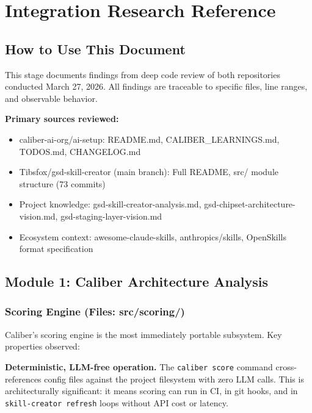 \documentclass[11pt,letterpaper]{article}
\newcommand{\stageheader}[2]{%
  \noindent\colorbox{#2}{\makebox[\textwidth][l]{%
    \textcolor{white}{\bfseries\sffamily\hspace{6pt}#1\hspace{6pt}}}}%
  \vspace{0.5em}\par%
}
\begin{document}
\newpage

\stageheader{STAGE 2 --- RESEARCH REFERENCE}{secondary}

\section{Integration Research Reference}

\subsection{How to Use This Document}

This stage documents findings from deep code review of both repositories conducted March 27, 2026. All findings are traceable to specific files, line ranges, and observable behavior.

\textbf{Primary sources reviewed:}
\begin{itemize}[leftmargin=1.5em]
  \item caliber-ai-org/ai-setup: README.md, CALIBER\_LEARNINGS.md, TODOS.md, CHANGELOG.md
  \item Tibsfox/gsd-skill-creator (main branch): Full README, src/ module structure (73 commits)
  \item Project knowledge: gsd-skill-creator-analysis.md, gsd-chipset-architecture-vision.md, gsd-staging-layer-vision.md
  \item Ecosystem context: awesome-claude-skills, anthropics/skills, OpenSkills format specification
\end{itemize}

\subsection{Module 1: Caliber Architecture Analysis}

\subsubsection{Scoring Engine (Files: src/scoring/)}

Caliber's scoring engine is the most immediately portable subsystem. Key properties observed:

\textbf{Deterministic, LLM-free operation.} The \texttt{caliber score} command cross-references config files against the project filesystem with zero LLM calls. This is architecturally significant: it means scoring can run in CI, in git hooks, and in \texttt{skill-creator refresh} loops without API cost or latency.
\end{document}
